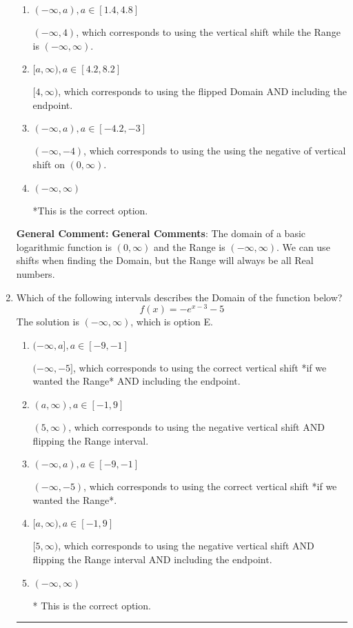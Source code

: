 \documentclass{extbook}[14pt]
\newcommand{\litem}[1]{\item #1

\rule{\textwidth}{0.4pt}}
\begin{document}
\begin{enumerate}
{\begin{enumerate}[label=\Alph*.]
$[-7, \infty)$, which corresponds to using the negative of the horizontal shift AND including the endpoint.
\item \( (-\infty, a), a \in [1.4, 4.8] \)

$(-\infty, 4)$, which corresponds to using the vertical shift while the Range is $(-\infty, \infty)$.
\item \( [a, \infty), a \in [4.2, 8.2] \)

$[4, \infty)$, which corresponds to using the flipped Domain AND including the endpoint.
\item \( (-\infty, a), a \in [-4.2, -3] \)

$(-\infty, -4)$, which corresponds to using the using the negative of vertical shift on $(0, \infty)$.
\item \( (-\infty, \infty) \)

*This is the correct option.
\end{enumerate}

\textbf{General Comment:} \textbf{General Comments}: The domain of a basic logarithmic function is $(0, \infty)$ and the Range is $(-\infty, \infty)$. We can use shifts when finding the Domain, but the Range will always be all Real numbers.
}
\litem{
Which of the following intervals describes the Domain of the function below?
\[ f(x) = -e^{x-3}-5 \]The solution is \( (-\infty, \infty) \), which is option E.\begin{enumerate}[label=\Alph*.]
\item \( (-\infty, a], a \in [-9, -1] \)

$(-\infty, -5]$, which corresponds to using the correct vertical shift *if we wanted the Range* AND including the endpoint.
\item \( (a, \infty), a \in [-1, 9] \)

$(5, \infty)$, which corresponds to using the negative vertical shift AND flipping the Range interval.
\item \( (-\infty, a), a \in [-9, -1] \)

$(-\infty, -5)$, which corresponds to using the correct vertical shift *if we wanted the Range*.
\item \( [a, \infty), a \in [-1, 9] \)

$[5, \infty)$, which corresponds to using the negative vertical shift AND flipping the Range interval AND including the endpoint.
\item \( (-\infty, \infty) \)

* This is the correct option.
\end{enumerate}

}
\end{enumerate}
\end{document}
